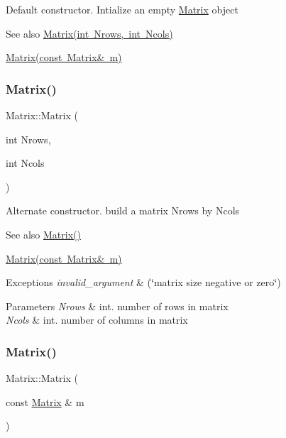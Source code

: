 Default constructor. Intialize an empty \mbox{\hyperlink{class_matrix}{Matrix}} object \begin{DoxySeeAlso}{See also}
\mbox{\hyperlink{class_matrix_a135a15de1126d735bb95fcc839d739d7}{Matrix(int Nrows, int Ncols)}} 

\mbox{\hyperlink{class_matrix_a765f4dcb51b6829311cc3e7576388423}{Matrix(const Matrix\& m)}} 
\end{DoxySeeAlso}
\mbox{\label{class_matrix_a135a15de1126d735bb95fcc839d739d7}} 
\subsubsection{\texorpdfstring{Matrix()}{Matrix()}\hspace{0.1cm}{\footnotesize\ttfamily [2/3]}}
{\footnotesize\ttfamily Matrix\+::\+Matrix (\begin{DoxyParamCaption}\item[{int}]{Nrows,  }\item[{int}]{Ncols }\end{DoxyParamCaption})}

Alternate constructor. build a matrix Nrows by Ncols \begin{DoxySeeAlso}{See also}
\mbox{\hyperlink{class_matrix_a2dba13c45127354c9f75ef576f49269b}{Matrix()}} 

\mbox{\hyperlink{class_matrix_a765f4dcb51b6829311cc3e7576388423}{Matrix(const Matrix\& m)}} 
\end{DoxySeeAlso}

\begin{DoxyExceptions}{Exceptions}
{\em invalid\+\_\+argument} & (\char`\"{}matrix size negative or zero\char`\"{}) \\
\hline
\end{DoxyExceptions}

\begin{DoxyParams}{Parameters}
{\em Nrows} & int. number of rows in matrix \\
\hline
{\em Ncols} & int. number of columns in matrix \\
\hline
\end{DoxyParams}
\mbox{\label{class_matrix_a765f4dcb51b6829311cc3e7576388423}} 
\subsubsection{\texorpdfstring{Matrix()}{Matrix()}\hspace{0.1cm}{\footnotesize\ttfamily [3/3]}}
{\footnotesize\ttfamily Matrix\+::\+Matrix (\begin{DoxyParamCaption}\item[{const \mbox{\hyperlink{class_matrix}{Matrix}} \&}]{m }\end{DoxyParamCaption})}


